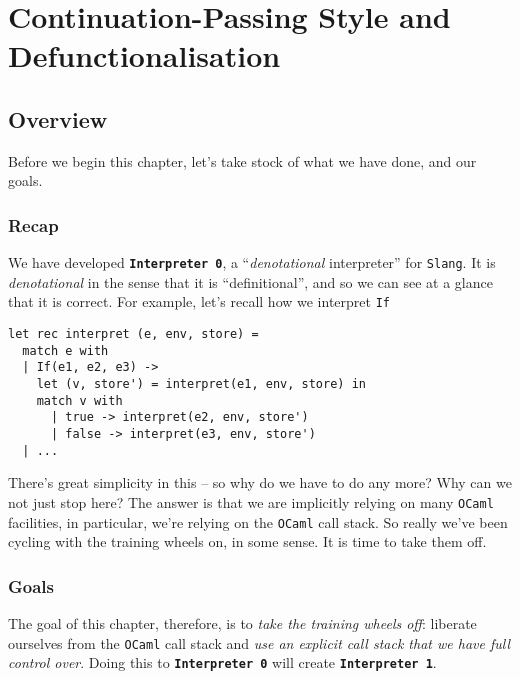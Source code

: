 \chapter{Continuation-Passing Style and Defunctionalisation}



\section{Overview}
Before we begin this chapter, let's take stock of what we have done, and our goals. 

\subsection{Recap}
We have developed \textbf{\texttt{Interpreter 0}}, a ``\emph{denotational} interpreter'' for \texttt{Slang}. It is \emph{denotational} in the sense that it is ``definitional'', and so we can see at a glance that it is correct. For example, let's recall how we interpret \texttt{If}

\begin{code}
\begin{verbatim}
let rec interpret (e, env, store) =
  match e with
  | If(e1, e2, e3) -> 
    let (v, store') = interpret(e1, env, store) in
    match v with 
      | true -> interpret(e2, env, store')
      | false -> interpret(e3, env, store')
  | ...
\end{verbatim}
\end{code}

There's great simplicity in this -- so why do we have to do any more? Why can we not just stop here? The answer is that we are implicitly relying on many \texttt{OCaml} facilities, in particular, we're relying on the \texttt{OCaml} call stack. So really we've been cycling with the training wheels on, in some sense. It is time to take them off. 

\subsection{Goals}
The goal of this chapter, therefore, is to \emph{take the training wheels off}: liberate ourselves from the \texttt{OCaml} call stack and \emph{use an explicit call stack that we have full control over}. Doing this to \textbf{\texttt{Interpreter 0}} will create \textbf{\texttt{Interpreter 1}}.

